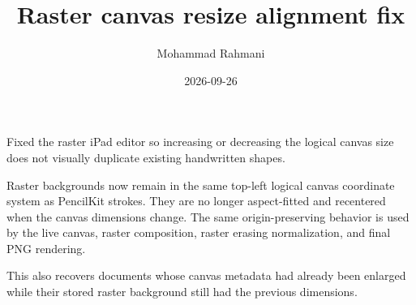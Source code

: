\documentclass[a4paper]{article}
\title{Raster canvas resize alignment fix}
\date{2026-09-26}
\author{Mohammad Rahmani}
\begin{document}
   \maketitle

   \begin{preview}
      Fixed the raster iPad editor so increasing or decreasing the logical canvas size does not visually duplicate existing handwritten shapes.

      Raster backgrounds now remain in the same top-left logical canvas coordinate system as PencilKit strokes. They are no longer aspect-fitted and recentered when the canvas dimensions change. The same origin-preserving behavior is used by the live canvas, raster composition, raster erasing normalization, and final PNG rendering.

      This also recovers documents whose canvas metadata had already been enlarged while their stored raster background still had the previous dimensions.
   \end{preview}

   
   
\end{document}
